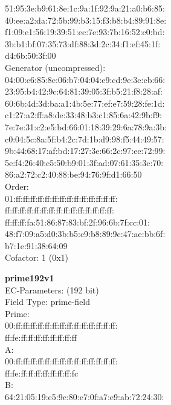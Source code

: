     51:95:3e:b9:61:8e:1c:9a:1f:92:9a:21:a0:b6:85:\\
    40:ee:a2:da:72:5b:99:b3:15:f3:b8:b4:89:91:8e:\\
    f1:09:e1:56:19:39:51:ec:7e:93:7b:16:52:c0:bd:\\
    3b:b1:bf:07:35:73:df:88:3d:2c:34:f1:ef:45:1f:\\
    d4:6b:50:3f:00\\
Generator (uncompressed):\\
    04:00:c6:85:8e:06:b7:04:04:e9:cd:9e:3e:cb:66:\\
    23:95:b4:42:9c:64:81:39:05:3f:b5:21:f8:28:af:\\
    60:6b:4d:3d:ba:a1:4b:5e:77:ef:e7:59:28:fe:1d:\\
    c1:27:a2:ff:a8:de:33:48:b3:c1:85:6a:42:9b:f9:\\
    7e:7e:31:c2:e5:bd:66:01:18:39:29:6a:78:9a:3b:\\
    c0:04:5c:8a:5f:b4:2c:7d:1b:d9:98:f5:44:49:57:\\
    9b:44:68:17:af:bd:17:27:3e:66:2c:97:ee:72:99:\\
    5e:f4:26:40:c5:50:b9:01:3f:ad:07:61:35:3c:70:\\
    86:a2:72:c2:40:88:be:94:76:9f:d1:66:50\\
Order: \\
    01:ff:ff:ff:ff:ff:ff:ff:ff:ff:ff:ff:ff:ff:ff:\\
    ff:ff:ff:ff:ff:ff:ff:ff:ff:ff:ff:ff:ff:ff:ff:\\
    ff:ff:ff:fa:51:86:87:83:bf:2f:96:6b:7f:cc:01:\\
    48:f7:09:a5:d0:3b:b5:c9:b8:89:9c:47:ae:bb:6f:\\
    b7:1e:91:38:64:09\\
Cofactor:  1 (0x1)\\
\item \textbf{ prime192v1 }\\
EC-Parameters: (192 bit)\\
Field Type: prime-field\\
Prime:\\
    00:ff:ff:ff:ff:ff:ff:ff:ff:ff:ff:ff:ff:ff:ff:\\
    ff:fe:ff:ff:ff:ff:ff:ff:ff:ff\\
A:   \\
    00:ff:ff:ff:ff:ff:ff:ff:ff:ff:ff:ff:ff:ff:ff:\\
    ff:fe:ff:ff:ff:ff:ff:ff:ff:fc\\
B:   \\
    64:21:05:19:e5:9c:80:e7:0f:a7:e9:ab:72:24:30:\\
